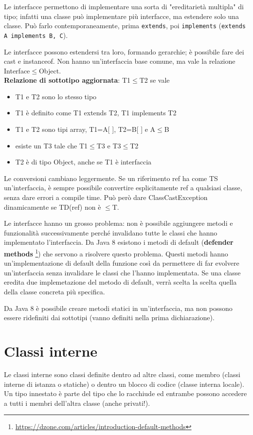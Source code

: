 Le interfacce permettono di implementare una sorta di "ereditarietà multipla" di tipo; infatti una classe può implementare più interfacce, ma estendere solo una classe. Può farlo contemporaneamente, prima \texttt{extends}, poi \texttt{implements} (\texttt{extends A implements B, C}).

Le interfacce possono estendersi tra loro, formando gerarchie; è possibile fare dei cast e instanceof. Non hanno un'interfaccia base comune, ma vale la relazione Interface$\le$Object. \\
\textbf{Relazione di sottotipo aggiornata}: T1$\le$T2 se vale
\begin{itemize}
\item T1 e T2 sono lo stesso tipo
\item T1 è definito come T1 extends T2, T1 implements T2
\item T1 e T2 sono tipi array, T1=A[ ], T2=B[ ] e A$\le$B
\item esiste un T3 tale che T1$\le$T3 e T3$\le$T2
\item T2 è di tipo Object, anche se T1 è interfaccia
\end{itemize}
Le conversioni cambiano leggermente. Se un riferimento ref ha come TS un'interfaccia, è sempre possibile convertire esplicitamente ref a qualsiasi classe, senza dare errori a compile time. Può però dare ClassCastException dinamicamente se TD(ref) non è $\le$T.

Le interfacce hanno un grosso problema: non è possibile aggiungere metodi e funzionalità successivamente perché invalidano tutte le classi che hanno implementato l'interfaccia. Da Java 8 esistono i metodi di default (\textbf{defender methods} \footnote{\url{https://dzone.com/articles/introduction-default-methods}}) che servono a risolvere questo problema. Questi metodi hanno un'implementazione di default della funzione così da permettere di far evolvere un'interfaccia senza invalidare le classi che l'hanno implementata. Se una classe eredita due implemetazione del metodo di default, verrà scelta la scelta quella della classe concreta più specifica.

Da Java 8 è possibile creare metodi statici in un'interfaccia, ma non possono essere ridefiniti dai sottotipi (vanno definiti nella prima dichiarazione).

\section{Classi interne}
Le classi interne sono classi definite dentro ad altre classi, come membro (classi interne di istanza o statiche) o dentro un blocco di codice (classe interna locale). Un tipo innestato è parte del tipo che lo racchiude ed entrambe possono accedere a tutti i membri dell'altra classe (anche privati!).


